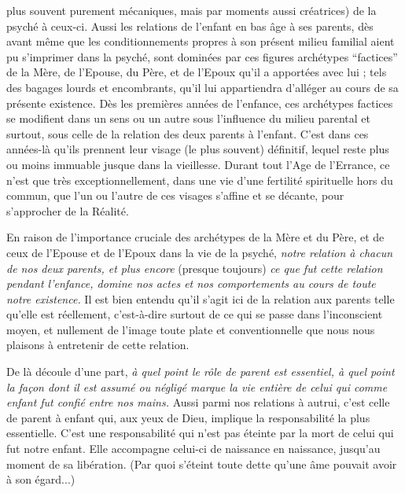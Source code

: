 plus souvent purement mécaniques, mais par moments aussi créatrices) de la psyché à ceux-ci. Aussi les relations de l'enfant en bas âge à ses parents, dès avant même que les conditionnements propres à son présent milieu familial aient pu s'imprimer dans la psyché, sont dominées par ces figures archétypes ``factices'' de la Mère, de l'Epouse, du Père, et de l'Epoux qu'il a apportées avec lui ; tels des bagages lourds et encombrants, qu'il lui appartiendra d'alléger au cours de sa présente existence. Dès les premières années de l'enfance, ces archétypes factices se modifient dans un sens ou un autre sous l'influence du milieu parental et surtout, sous celle de la relation des deux parents à l'enfant. C'est dans ces années-là qu'ils prennent leur visage (le plus souvent) définitif, lequel reste plus ou moins immuable jusque dans la vieillesse. Durant tout l'Age de l'Errance, ce n'est que très exceptionnellement, dans une vie d'une fertilité spirituelle hors du commun, que l'un ou l'autre de ces visages s'affine et se décante, pour s'approcher de la Réalité.

En raison de l'importance cruciale des archétypes de la Mère et du Père, et de ceux de l'Epouse et de l'Epoux dans la vie de la psyché, \textit{notre relation à chacun de nos deux parents, et plus encore} (presque toujours) \textit{ce que fut cette relation pendant l'enfance, domine nos actes et nos comportements au cours de toute notre existence.} Il est bien entendu qu'il s'agit ici de la relation aux parents telle qu'elle est réellement, c'est-à-dire surtout de ce qui se passe dans l'inconscient moyen, et nullement de l'image toute plate et conventionnelle que nous nous plaisons à entretenir de cette relation.

De là découle d'une part, \textit{à quel point le rôle de parent est essentiel, à quel point la façon dont il est assumé ou négligé marque la vie entière de celui qui comme enfant fut confié entre nos mains.} Aussi parmi nos relations à autrui, c'est celle de parent à enfant qui, aux yeux de Dieu, implique la responsabilité la plus essentielle. C'est une responsabilité qui n'est pas éteinte par la mort de celui qui fut notre enfant. Elle accompagne celui-ci de naissance en naissance, jusqu'au moment de sa libération. (Par quoi s'éteint toute dette qu'une âme pouvait avoir à son égard...)

